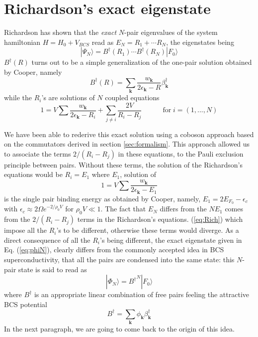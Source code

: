 \documentclass[aps,prb,preprint,groupedaddress,amsmath]{revtex4-1}
\newcommand{\vk}{\ensuremath{\mathbf{k}}}
\newcommand{\dg}{\ensuremath{\dagger}}
\begin{document}
\section{Richardson's exact eigenstate}
Richardson has shown that the \emph{exact} $N$-pair eigenvalues of the system hamiltonian $H=H_0+V_{BCS}$ read as $E_N=R_1+\cdots{}R_N$, the eigenstates being
\begin{equation}\label{eq:phiN}
|\Psi_N{\rangle}=B^{\dagger}(R_1)\cdots{}B^{\dagger}(R_N)|F_0{\rangle}  
\end{equation}
$B^{\dagger}(R)$ turns out to be a simple generalization of the one-pair solution obtained by Cooper, namely
\begin{equation}  \label{eq:B}
B^{\dagger}(R)=\sum_\vk\frac{w_\vk}{2\epsilon_\vk-R}\beta^{\dagger}_\vk
\end{equation}
while the $R_i$'s are solutions of $N$ coupled equations
\begin{equation}\label{eq:Rich}
1=V\sum\frac{w_{\mathbf{k} }}{2\epsilon_{\mathbf{k} }-R_i}+\sum_{j\neq{i}}%
\frac{2V}{R_i-R_j}\quad\qquad \text{for}\; i=\left(1,...,N\right) 
\end{equation}

We have been able to rederive this exact solution using a coboson approach based on the  commutators derived in section \ref{sec:formalism}.  This approach allowed us to associate the terms $2/(R_i-R_j)$ in these equations, to the Pauli exclusion principle between pairs.  Without these terms, the solution of the Richardson's equations would be $R_i=E_1$ where $E_1$, solution of
\begin{equation}
1=V\sum\frac{w_{\mathbf{k} }}{2\epsilon_{\mathbf{k} }-E_1}
\end{equation}
 is the single pair binding energy as obtained by Cooper, namely, $E_1=2E_{F_0}-\epsilon_c$ with $\epsilon_c\approx2\Omega{}e^{-2/\rho_0V}$ for $\rho_0V\ll1$. The fact that $E_N$ differs from the $NE_1$ comes from the $2/(R_i-R_j)$ terms in the Richardson's equations. (\ref{eq:Rich})  which impose all the $R_i$'s to be different, otherwise these terms would diverge. As a direct consequence of all the $R_i$'s being different, the exact eigenstate given in Eq. (\ref{eq:phiN}), clearly differs from the commonly accepted idea  in BCS superconductivity, that all the pairs are condensed into the same state:  this  $N$-pair state is said to read as 
\begin{equation}\label{eq:phiNBcs}
|\Phi_N{\rangle}={B^{\dagger}}^N|F_0{\rangle}  
\end{equation}
where $B^\dagger$ is an appropriate linear combination of free pairs feeling the attractive BCS potential
\begin{equation}\label{eq:bBeta}
B^\dg=\sum_\vk\phi_\vk\beta^\dg_\vk
\end{equation}
In the next paragraph, we are going to come back to the origin of this idea.  
\end{document}
